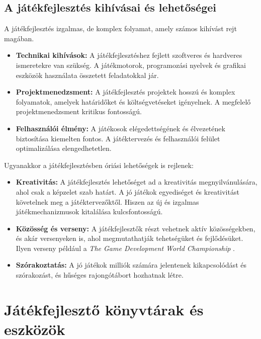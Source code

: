 \subsection{A játékfejlesztés kihívásai és lehetőségei}
 A játékfejlesztés izgalmas, de komplex folyamat, amely számos kihívást rejt magában.
\begin{itemize}
    \item \textbf{Technikai kihívások:} A játékfejlesztéshez fejlett szoftveres és hardveres ismeretekre van szükség. A játékmotorok, programozási nyelvek és grafikai eszközök használata összetett feladatokkal jár.

    
    \item \textbf{Projektmenedzsment:} A játékfejlesztés projektek hosszú és komplex folyamatok, amelyek határidőket és költségvetéseket igényelnek. A megfelelő projektmenedzsment kritikus fontosságú.
    
    \item \textbf{Felhasználói élmény:} A játékosok elégedettségének és élvezetének biztosítása kiemelten fontos. A játéktervezés és felhasználói felület optimalizálása elengedhetetlen.
    
\end{itemize}

Ugyanakkor a játékfejlesztésben óriási lehetőségek is rejlenek:

\begin{itemize}

    \item \textbf{Kreativitás:} A játékfejlesztés lehetőséget ad a kreativitás megnyilvánulására, ahol csak a képzelet szab határt. A jó játékok egyediséget és kreativitást követelnek meg a játéktervezőktől. Hiszen az új és izgalmas játékmechanizmusok kitalálása kulcsfontosságú.
    
    \item \textbf{Közösség és verseny:} A játékfejlesztők részt vehetnek aktív közösségekben, és akár versenyeken is, ahol megmutathatják tehetségüket és fejlődésüket. Ilyen verseny például a \textsl{The Game Development World Championship} \cite{tgdwc}.

    \item \textbf{Szórakoztatás:} A jó játékok milliók számára jelentenek kikapcsolódást és szórakozást, és hűséges rajongótábort hozhatnak létre.
\end{itemize}
\section{Játékfejlesztő könyvtárak és eszközök}

